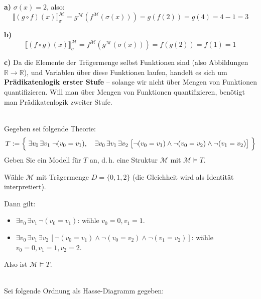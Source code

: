 \begin{loesung}
\textbf{a)} $\sigma(x)=2$, also:
\[
  \llbracket(g\circ f)(x)\rrbracket^\mathcal{M}_\sigma = g^\mathcal{M}(f^\mathcal{M}(\sigma(x))) = g(f(2)) = g(4) = 4-1 = 3
\]

\textbf{b)}
\[
  \llbracket(f\circ g)(x)\rrbracket^\mathcal{M}_\sigma = f^\mathcal{M}(g^\mathcal{M}(\sigma(x))) = f(g(2)) = f(1) = 1
\]

\textbf{c)} Da die Elemente der Trägermenge selbst Funktionen sind (also Abbildungen $\mathbb{R}\to\mathbb{R}$), und Variablen über diese Funktionen laufen, handelt es sich um \textbf{Prädikatenlogik erster Stufe} -- solange wir nicht über Mengen von Funktionen quantifizieren. Will man über Mengen von Funktionen quantifizieren, benötigt man Prädikatenlogik zweiter Stufe.
\end{loesung}

\\
Gegeben sei folgende Theorie:
\[
  T := \Bigl\{\;\exists v_0\, \exists v_1\; \neg(v_0 = v_1),\quad
  \exists v_0\, \exists v_1\, \exists v_2\; \bigl[\neg(v_0=v_1) \wedge \neg(v_0=v_2) \wedge \neg(v_1=v_2)\bigr]\;\Bigr\}
\]
Geben Sie ein Modell für $T$ an, d.\,h. eine Struktur $\mathcal{M}$ mit $\mathcal{M} \models T$.

\begin{loesung}
Wähle $\mathcal{M}$ mit Trägermenge $D = \{0, 1, 2\}$ (die Gleichheit wird als Identität interpretiert).

Dann gilt:
\begin{itemize}
  \item $\exists v_0\,\exists v_1\,\neg(v_0=v_1)$: wähle $v_0=0, v_1=1$. \checkmark
  \item $\exists v_0\,\exists v_1\,\exists v_2\,[\neg(v_0=v_1)\wedge\neg(v_0=v_2)\wedge\neg(v_1=v_2)]$: wähle $v_0=0,v_1=1,v_2=2$. \checkmark
\end{itemize}
Also ist $\mathcal{M}\models T$.
\end{loesung}

\\
Sei folgende Ordnung als Hasse-Diagramm gegeben:

\begin{center}
\end{center}

